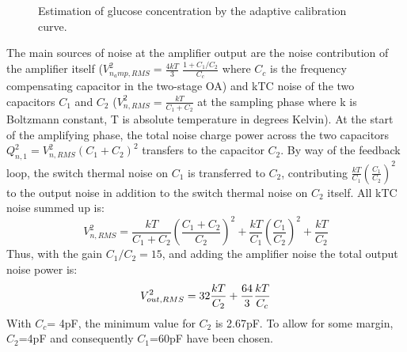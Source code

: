 \documentclass[twocolumn]{htl-author}
\begin{document}
\begin{figure}[!b]
\caption{Estimation of glucose concentration by the adaptive calibration curve.}
\end{figure}

The main sources of noise at the amplifier output are the noise contribution of the amplifier itself ($V_{n_amp,RMS}^{2}=\frac{4kT}{3}\;\frac{1+C_1/C_2}{C_{c}}$ \cite{Schreier_Silva_Steensgaard_Temes05} where $C_{c}$ is the frequency compensating capacitor in the two-stage OA) and kTC noise of the two capacitors $C_1$ and $C_2$ ($V_{n,RMS}^{2}=\frac{kT}{C_{1}+C_{2}}$ at the sampling phase where k is Boltzmann constant, T is absolute temperature in degrees Kelvin). At the start of the amplifying phase, the total noise charge power across the two capacitors $Q_{n,1}^{2} = V_{n,RMS}^{2}{(C_1+C_2)^{2}}$ transfers to the capacitor $C_2$. By way of the feedback loop, the switch thermal noise on $C_1$ is transferred to $C_2$, contributing $\frac{kT}{C_1}\left(\frac{C_1}{C_2}\right)^{2}$ to the output noise in addition to the switch thermal noise on $C_2$ itself. All kTC noise summed up is:
\begin{equation}
V_{n,RMS}^{2}=\dfrac{kT}{C_{1}+C_{2}}\left(\dfrac{C_1+C_2}{C_2}\right)^{2}+\frac{kT}{C_1}\left(\frac{C_1}{C_2}\right)^{2}+\dfrac{kT}{C_2}
\label{equation2}
\end{equation}
Thus, with the gain $C_1/C_2 =15$, and adding the amplifier noise the total output noise power is:
\begin{equation}
V_{out,RMS}^{2} = 32\dfrac{kT}{C_{2}}+\dfrac{64}{3}\dfrac{kT}{C_c}\\
\label{equation3}
\end{equation}
With $C_{c}$= 4pF, the minimum value for $C_2$ is 2.67pF. To allow for some margin, $C_{2}$=4pF and consequently $C_1$=60pF have been chosen.
\end{document}
